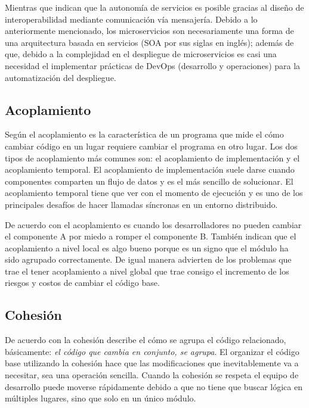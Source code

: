 Mientras que \cite{nadareishvili2016microservice} indican que la autonomía de servicios es posible
gracias al diseño de interoperabilidad mediante comunicación vía mensajería.
Debido a lo anteriormente mencionado, los microservicios son necesariamente una forma de una
arquitectura basada en servicios (SOA por sus siglas en inglés); además de que, debido a la
complejidad en el despliegue de microservicios es casi una necesidad el implementar prácticas de
DevOps (desarrollo y operaciones) para la automatización del despliegue.


\subsection{Acoplamiento}

Según \cite{newman2019monolith} el acoplamiento es la característica de un programa que mide el cómo
cambiar código en un lugar requiere cambiar el programa en otro lugar.
Los dos tipos de acoplamiento más comunes son: el acoplamiento de implementación y el acoplamiento temporal.
El acoplamiento de implementación suele darse cuando componentes comparten un flujo de datos y es el más
sencillo de solucionar.
El acoplamiento temporal tiene que ver con el momento de ejecución y es uno de los principales
desafíos de hacer llamadas síncronas en un entorno distribuido.

De acuerdo con \cite{percival2020architecture} el acoplamiento es cuando los desarrolladores no
pueden cambiar el componente A por miedo a romper el componente B. También indican que el
acoplamiento a nivel local es algo bueno porque es un signo que el módulo ha sido agrupado correctamente.
De igual manera advierten de los problemas que trae el tener acoplamiento a nivel global que trae
consigo el incremento de los riesgos y costos de cambiar el código base.


\subsection{Cohesión}

De acuerdo con \cite{newman2019monolith} la cohesión describe el cómo se agrupa el código relacionado,
básicamente: {\it el código que cambia en conjunto, se agrupa}.
El organizar el código base utilizando la cohesión hace que las modificaciones que inevitablemente
va a necesitar, sea una operación sencilla.
Cuando la cohesión se respeta el equipo de desarrollo puede moverse rápidamente debido a que no tiene
que buscar lógica en múltiples lugares, sino que solo en un único módulo.


